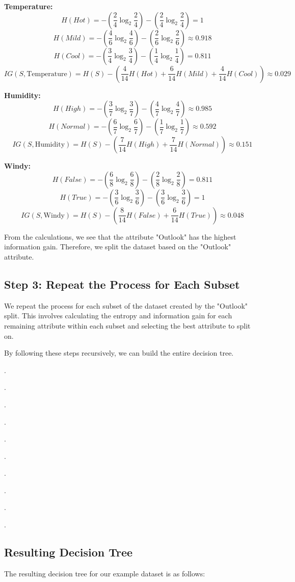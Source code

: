 \documentclass[12pt]{article}
\begin{document}
\textbf{Temperature:}
\[
H(Hot) = -\left(\frac{2}{4} \log_2 \frac{2}{4}\right) - \left(\frac{2}{4} \log_2 \frac{2}{4}\right) = 1
\]
\[
H(Mild) = -\left(\frac{4}{6} \log_2 \frac{4}{6}\right) - \left(\frac{2}{6} \log_2 \frac{2}{6}\right) \approx 0.918
\]
\[
H(Cool) = -\left(\frac{3}{4} \log_2 \frac{3}{4}\right) - \left(\frac{1}{4} \log_2 \frac{1}{4}\right) = 0.811
\]
\[
IG(S, \text{Temperature}) = H(S) - \left(\frac{4}{14} H(Hot) + \frac{6}{14} H(Mild) + \frac{4}{14} H(Cool)\right) \approx 0.029
\]

\textbf{Humidity:}
\[
H(High) = -\left(\frac{3}{7} \log_2 \frac{3}{7}\right) - \left(\frac{4}{7} \log_2 \frac{4}{7}\right) \approx 0.985
\]
\[
H(Normal) = -\left(\frac{6}{7} \log_2 \frac{6}{7}\right) - \left(\frac{1}{7} \log_2 \frac{1}{7}\right) \approx 0.592
\]
\[
IG(S, \text{Humidity}) = H(S) - \left(\frac{7}{14} H(High) + \frac{7}{14} H(Normal)\right) \approx 0.151
\]

\textbf{Windy:}
\[
H(False) = -\left(\frac{6}{8} \log_2 \frac{6}{8}\right) - \left(\frac{2}{8} \log_2 \frac{2}{8}\right) = 0.811
\]
\[
H(True) = -\left(\frac{3}{6} \log_2 \frac{3}{6}\right) - \left(\frac{3}{6} \log_2 \frac{3}{6}\right) = 1
\]
\[
IG(S, \text{Windy}) = H(S) - \left(\frac{8}{14} H(False) + \frac{6}{14} H(True)\right) \approx 0.048
\]

From the calculations, we see that the attribute "Outlook" has the highest information gain. Therefore, we split the dataset based on the "Outlook" attribute.

\subsection{Step 3: Repeat the Process for Each Subset}
We repeat the process for each subset of the dataset created by the "Outlook" split. This involves calculating the entropy and information gain for each remaining attribute within each subset and selecting the best attribute to split on.

By following these steps recursively, we can build the entire decision tree.

.

.

.

.

.

.

.

.

.

.
\subsection{Resulting Decision Tree}
The resulting decision tree for our example dataset is as follows:
\end{document}
